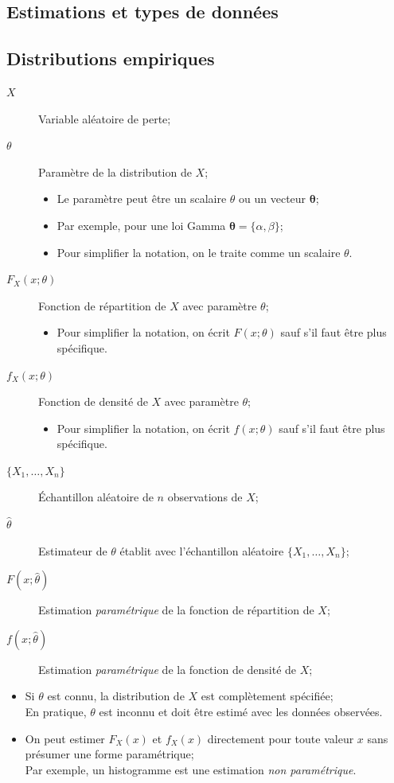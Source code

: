\documentclass[french]{article}
\begin{document}
\begin{multicols*}{2}
\newpage
\section{Estimations et types de données}
\subsection{Distributions empiriques}
\begin{distributions}[Notation]
\begin{description}
	\item[$X$]	Variable aléatoire de perte;
	\item[$\theta$]	Paramètre de la distribution de $X$;
		\begin{itemize}[leftmargin = *]
		\item	Le paramètre peut être un scalaire $\theta$ ou un vecteur $\bm{\theta}$;
		\item	Par exemple, pour une loi Gamma $\bm{\theta} = \{\alpha,	\beta\}$;
		\item	Pour simplifier la notation, on le traite comme un scalaire $\theta$.
		\end{itemize}
	\item[$F_{X}(x; \theta)$]	Fonction de répartition de $X$ avec paramètre $\theta$;
		\begin{itemize}[leftmargin = *]
		\item	Pour simplifier la notation, on écrit $F(x; \theta)$ sauf s'il faut être plus spécifique.
		\end{itemize}
	\item[$f_{X}(x; \theta)$]	Fonction de densité de $X$ avec paramètre $\theta$;
		\begin{itemize}[leftmargin = *]
		\item	Pour simplifier la notation, on écrit $f(x; \theta)$ sauf s'il faut être plus spécifique.
		\end{itemize}
	\item[$\{X_{1}, \dots, X_{n}\}$]	Échantillon aléatoire de $n$ observations de $X$;
	\item[$\hat{\theta}$]	Estimateur de $\theta$ établit avec l'échantillon aléatoire $\{X_{1}, \dots, X_{n}\}$;
	\item[$F(x; \hat{\theta})$]	Estimation \textit{paramétrique} de la fonction de répartition de $X$;
	\item[$f(x; \hat{\theta})$]	Estimation \textit{paramétrique} de la fonction de densité de $X$;
\end{description}
\end{distributions}
\begin{itemize}[leftmargin = *]
	\item	Si $\theta$ est connu, la distribution de $X$ est complètement spécifiée;\\
			En pratique, $\theta$ est inconnu et doit être estimé avec les données observées.
	\item	On peut estimer $F_{X}(x)$ et $f_{X}(x)$ directement pour toute valeur $x$ sans présumer une forme paramétrique;\\
			Par exemple, un histogramme est une estimation \textit{non paramétrique}.
\end{itemize}



\end{multicols*}
\end{document}
